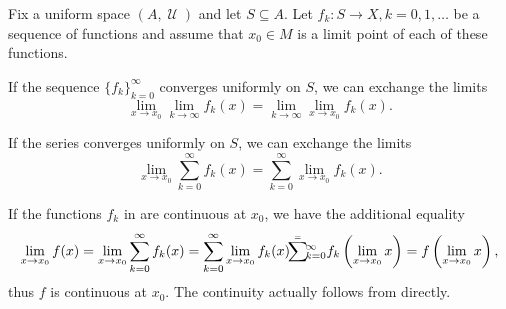 \begin{theorem}\label{thm:uniform_limit_exchange}
  Fix a uniform space \( (A, \mscrU) \) and let \( S \subseteq A \). Let \( f_k: S \to X, k = 0, 1, \ldots \) be a sequence of functions and assume that \( x_0 \in M \) is a limit point of each of these functions.

  \begin{thmenum}
     If the sequence \( \{ f_k \}_{k=0}^\infty \) converges uniformly on \( S \), we can exchange the limits
    \begin{equation*}
      \lim_{x \to x_0} \lim_{k \to \infty} f_k(x)
      =
      \lim_{k \to \infty} \lim_{x \to x_0} f_k(x).
    \end{equation*}

     If the series  converges uniformly on \( S \), we can exchange the limits
    \begin{equation*}
      \lim_{x \to x_0} \sum_{k=0}^\infty f_k(x)
      =
      \sum_{k=0}^\infty \lim_{x \to x_0} f_k(x).
    \end{equation*}
  \end{thmenum}
\end{theorem}

\begin{remark}\label{rem:thm:uniform_limit_exchange_continuity}
  If the functions \( f_k \) in  are continuous at \( x_0 \), we have the additional equality
  \begin{equation}\label{thm:uniform_limit_exchange/continuous_equality}
    \lim_{x \to x_0} f(x)
    =
    \lim_{x \to x_0} \sum_{k=0}^\infty f_k(x)
    =
    \sum_{k=0}^\infty \lim_{x \to x_0} f_k(x)
    \reloset * =
    \sum_{k=0}^\infty f_k\left(\lim_{x \to x_0} x \right)
    =
    f\left(\lim_{x \to x_0} x \right),
  \end{equation}
  thus \( f \) is continuous at \( x_0 \). The continuity actually follows from  directly.
\end{remark}

